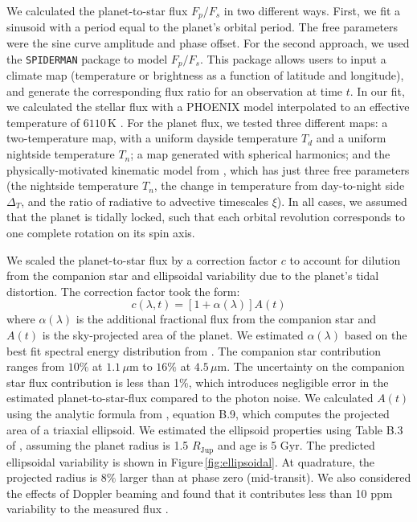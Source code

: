 \documentclass[twocolumn]{aastex61}
\begin{document}
We calculated the planet-to-star flux $F_p/F_s$ in two different ways. First, we fit a sinusoid with a period equal to the planet's orbital period. The free parameters were the sine curve amplitude and phase offset. For the second approach, we used the \texttt{SPIDERMAN} package \citep{louden17} to model $F_p/F_s$. This package allows users to input a climate map (temperature or brightness as a function of latitude and longitude), and generate the corresponding flux ratio for an observation at time $t$. In our fit, we calculated the stellar flux with a PHOENIX model \citep{husser13} interpolated to an effective temperature of $6110\,\mathrm{K}$ \citep{gillon14}.  For the planet flux, we tested three different maps: a two-temperature map, with a uniform dayside temperature $T_d$ and a uniform nightside temperature $T_n$; a map generated with spherical harmonics; and the physically-motivated kinematic model from \cite{zhang17}, which has just three free parameters (the nightside temperature $T_n$, the change in temperature from day-to-night side $\Delta_T$, and the ratio of radiative to advective timescales $\xi$).  In all cases, we assumed that the planet is tidally locked, such that each orbital revolution corresponds to one complete rotation on its spin axis. 

We scaled the planet-to-star flux by a correction factor $c$ to account for dilution from the companion star and ellipsoidal variability due to the planet's tidal distortion. The correction factor took the form: 
\begin{equation}
	c(\lambda, t) = [1 + \alpha(\lambda)]A(t)
\end{equation}
where $\alpha(\lambda)$ is the additional fractional flux from the companion star and $A(t)$ is the sky-projected area of the planet. We estimated $\alpha(\lambda)$ based on the best fit spectral energy distribution from \cite{cartier17}. The companion star contribution ranges from $10\%$ at $1.1\,\mu$m to $16\%$ at $4.5\,\mu$m. The uncertainty on the companion star flux contribution is less than 1\%, which introduces negligible error in the estimated planet-to-star-flux compared to the photon noise.   We calculated $A(t)$ using the analytic formula from \cite{leconte11b}, equation B.9, which computes the projected area of a triaxial ellipsoid. We estimated the ellipsoid properties using Table B.3 of \cite{leconte11a}, assuming the planet radius is 1.5 $R_\mathrm{Jup}$ and age is 5 Gyr. The predicted ellipsoidal variability is shown in Figure\,\ref{fig:ellipsoidal}. At quadrature, the projected radius is $8\%$ larger than at phase zero (mid-transit). We also considered the effects of Doppler beaming and found that it contributes less than 10 ppm variability to the measured flux \citep{loeb03}.
\end{document}
